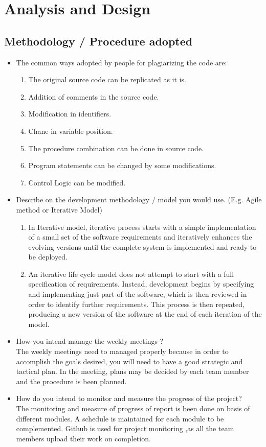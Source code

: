 \chapter{Analysis and Design}
\section{Methodology / Procedure adopted}
\begin{itemize}
\item The common ways adopted by people for plagiarizing the code are:
\begin{enumerate}
 \item The original source code can be replicated as it is.
 \item Addition of comments in the source code.
 \item Modification in identifiers. 
 \item Chane in variable position.
 \item The procedure combination can be done in source code.
 \item Program statements can be changed by some modifications.
 \item Control Logic can be modified.
 \end{enumerate}
\item Describe on the development methodology / model you would use. (E.g. Agile method or Iterative Model)
\begin{enumerate}
\item In Iterative model, iterative process starts with a simple implementation of a small set of the software requirements and iteratively enhances the evolving versions until the complete system is implemented and ready to be deployed.
\item An iterative life cycle model does not attempt to start with a full specification of requirements. Instead, development begins by specifying and implementing just part of the software, which is then reviewed in order to identify further requirements. This process is then repeated, producing a new version of the software at the end of each iteration of the model.\\
\end{enumerate}
\item How you intend manage the weekly meetings ? \\
The weekly meetings need to managed properly because in order to accomplish the goals desired, you will need to have a good strategic and tactical plan. In the meeting, plans may be decided by each team member and the procedure is been planned.
\item How do you intend to monitor and measure the progress of the project? \\ 
The monitoring and measure of progress of report is been done on basis of different modules. A schedule is maintained for each module to be complemented. Github is used for project monitoring ,as all the team members upload their work on completion. 
\end{itemize}
